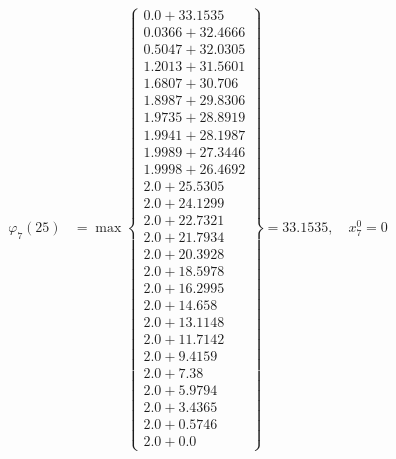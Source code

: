 \documentclass{article}
\begin{document}
\begin{align*}
  
\varphi_{7}(25) &= \max \left\{ \begin{array}{c}
0.0 + 33.1535 \\
 0.0366 + 32.4666 \\
 0.5047 + 32.0305 \\
 1.2013 + 31.5601 \\
 1.6807 + 30.706 \\
 1.8987 + 29.8306 \\
 1.9735 + 28.8919 \\
 1.9941 + 28.1987 \\
 1.9989 + 27.3446 \\
 1.9998 + 26.4692 \\
 2.0 + 25.5305 \\
 2.0 + 24.1299 \\
 2.0 + 22.7321 \\
 2.0 + 21.7934 \\
 2.0 + 20.3928 \\
 2.0 + 18.5978 \\
 2.0 + 16.2995 \\
 2.0 + 14.658 \\
 2.0 + 13.1148 \\
 2.0 + 11.7142 \\
 2.0 + 9.4159 \\
 2.0 + 7.38 \\
 2.0 + 5.9794 \\
 2.0 + 3.4365 \\
 2.0 + 0.5746 \\
 2.0 + 0.0
\end{array} \right\}=33.1535,\quad x_{7}^0=0\\
  
  
  

\end{align*}
\end{document}
